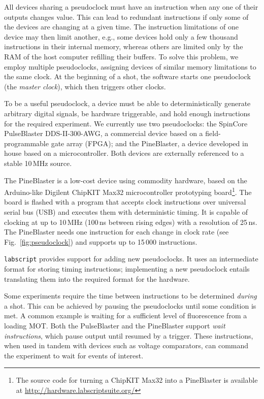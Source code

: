 All devices sharing a pseudoclock must have an instruction when any one of their outputs changes value.
This can lead to redundant instructions if only some of the devices are changing at a given time.
The instruction limitations of one device may then limit another, e.g., some devices hold only a few thousand instructions in their internal memory, whereas others are limited only by the RAM of the host computer refilling their buffers.
To solve this problem, we employ multiple pseudoclocks, assigning devices of similar memory limitations to the same clock.
At the beginning of a shot, the software starts one pseudoclock (the \textit{master clock}), which then triggers other clocks.

To be a useful pseudoclock, a device must be able to deterministically generate arbitrary digital signals, be hardware triggerable, and hold enough instructions for the required experiment.
We currently use two pseudoclocks: the SpinCore PulseBlaster DDS-II-300-AWG, a commercial device based on a field-programmable gate array (FPGA); and the PineBlaster, a device developed in house based on a microcontroller.
Both devices are externally referenced to a stable 10\,MHz source.

The PineBlaster is a low-cost device using commodity hardware, based on the Arduino-like Digilent ChipKIT Max32 microcontroller prototyping board\footnote{The source code for turning a ChipKIT Max32 into a PineBlaster is available at \protect\url{http://hardware.labscriptsuite.org/}}.
The board is flashed with a program that accepts clock instructions over universal serial bus (USB) and executes them with deterministic timing.
It is capable of clocking at up to 10\,MHz (100\,ns between rising edges) with a resolution of 25\,ns.
The PineBlaster needs one instruction for each change in clock rate (see Fig.~\ref{fig:pseudoclock}) and supports up to 15\,000 instructions.

\texttt{labscript} provides support for adding new pseudoclocks.
It uses an intermediate format for storing timing instructions; implementing a new pseudoclock entails translating them into the required format for the hardware.

Some experiments require the time between instructions to be determined \textit{during} a shot.
This can be achieved by pausing the pseudoclocks until some condition is met.
A common example\cite{keshet_distributed_2013,owen_fast_2004,meyrath_laboratory_2012} is waiting for a sufficient level of fluorescence from a loading MOT.
Both the PulseBlaster and the PineBlaster support \textit{wait instructions}, which pause output until resumed by a trigger.
These instructions, when used in tandem with devices such as voltage comparators, can command the experiment to wait for events of interest.

